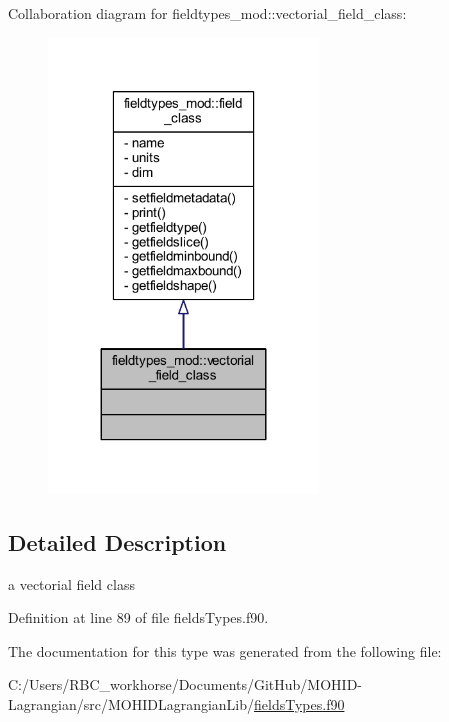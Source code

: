 Collaboration diagram for fieldtypes\+\_\+mod\+:\+:vectorial\+\_\+field\+\_\+class\+:\nopagebreak
\begin{figure}[H]
\begin{center}
\leavevmode
\includegraphics[width=203pt]{structfieldtypes__mod_1_1vectorial__field__class__coll__graph}
\end{center}
\end{figure}


\subsection{Detailed Description}
a vectorial field class 

Definition at line 89 of file fields\+Types.\+f90.



The documentation for this type was generated from the following file\+:\begin{DoxyCompactItemize}
\item 
C\+:/\+Users/\+R\+B\+C\+\_\+workhorse/\+Documents/\+Git\+Hub/\+M\+O\+H\+I\+D-\/\+Lagrangian/src/\+M\+O\+H\+I\+D\+Lagrangian\+Lib/\mbox{\hyperlink{fields_types_8f90}{fields\+Types.\+f90}}\end{DoxyCompactItemize}
